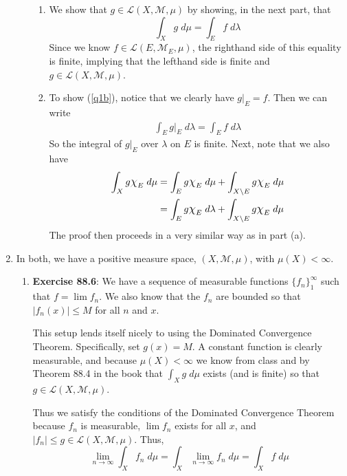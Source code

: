 \documentclass[12pt]{article}
\theoremstyle{plain}
\theoremstyle{definition}
\theoremstyle{remark}
\newcommand*{\Chi}{\mbox{\large$\chi$}} %
\begin{document}
\begin{enumerate}
\begin{enumerate}
\begin{enumerate}
\item We show that $g\in\mathscr{L}(X,\mathscr{M},\mu)$ by showing, in the next part, that 
\[
    \int_X g \; d\mu = \int_E f \; d\lambda
\]
Since we know $f\in\mathscr{L}(E,\mathscr{M}_E,\mu)$, the righthand side of this equality is finite, implying that the lefthand side is finite and $g\in\mathscr{L}(X,\mathscr{M},\mu)$.   

\item To show (\ref{q1b}), notice that we clearly have $g|_E = f$. Then we can write
\begin{align*}
    \int_E g|_E \; d\lambda  = \int_E f \; d\lambda 
\end{align*}
So the integral of $g|_E$ over $\lambda$ on $E$ is finite. Next, note that we also have
\begin{align*}
    \int_X g \Chi_E \; d\mu &= 
    \int_E g \Chi_E \; d\mu + 
    \int_{X\setminus E} g \Chi_E \; d\mu  \\
    &= \int_E g \Chi_E \; d\lambda + 
    \int_{X\setminus E} g \Chi_E \; d\mu 
\end{align*}
The proof then proceeds in a very similar way as in part (a).


\end{enumerate}


\end{enumerate}

\item In both, we have a positive measure space, $(X,\mathscr{M},\mu)$, with $\mu(X)<\infty$.

\begin{enumerate} 

\item \textbf{Exercise 88.6}: We have a sequence of measurable functions $\{f_n\}_1^\infty$ such that $f=\lim f_n$. We also know that the $f_n$ are bounded so that $|f_n(x)|\leq M$ for all $n$ and $x$. 

This setup lends itself nicely to using the Dominated Convergence Theorem.  Specifically, set $g(x)=M$. A constant function is clearly measurable, and because $\mu(X)<\infty$ we know from class and by Theorem 88.4 in the book that $\int_X g \; d\mu$ exists (and is finite) so that $g\in\mathscr{L}(X,\mathscr{M},\mu)$.

Thus we satisfy the conditions of the Dominated Convergence Theorem because $f_n$ is measurable, $\lim f_n$ exists for all $x$, and $|f_n|\leq g\in\mathscr{L}(X,\mathscr{M},\mu)$. Thus, 
\[
  \lim_{n\rightarrow\infty} \int_X f_n \; d\mu  
  = \int_X \lim_{n\rightarrow\infty} f_n \; d\mu
  = \int_X  f \; d\mu
\]


\end{enumerate}
\end{enumerate}
\end{document}
